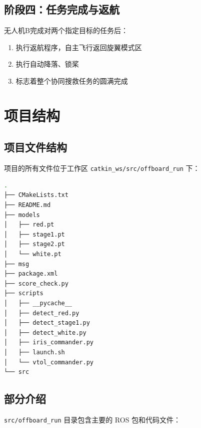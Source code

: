 \documentclass[12pt]{article}
\begin{document}
\subsection{阶段四：任务完成与返航}
无人机B完成对两个指定目标的任务后：
\begin{enumerate}
    \item 执行返航程序，自主飞行返回旋翼模式区
    \item 执行自动降落、锁桨
    \item 标志着整个协同搜救任务的圆满完成
\end{enumerate}

\section{项目结构}
\subsection{项目文件结构}
项目的所有文件位于工作区 \texttt{catkin\_ws/src/offboard\_run} 下：
\begin{lstlisting}[language=bash]
.
├── CMakeLists.txt
├── README.md
├── models
│   ├── red.pt
│   ├── stage1.pt
│   ├── stage2.pt
│   └── white.pt
├── msg
├── package.xml
├── score_check.py
├── scripts
│   ├── __pycache__
│   ├── detect_red.py
│   ├── detect_stage1.py
│   ├── detect_white.py
│   ├── iris_commander.py
│   ├── launch.sh
│   └── vtol_commander.py
└── src
\end{lstlisting}

\subsection{部分介绍}
\texttt{src/offboard\_run} 目录包含主要的 ROS 包和代码文件：
\end{document}
